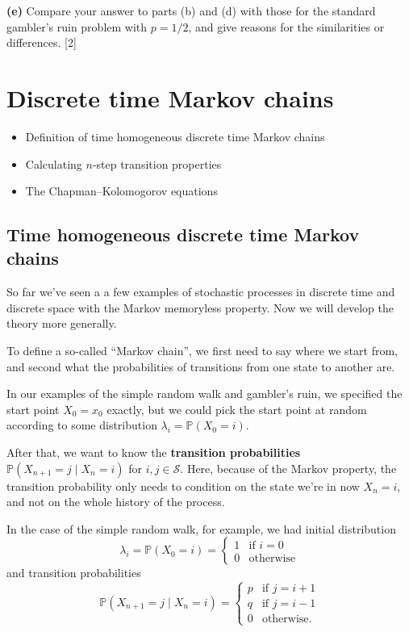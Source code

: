 \documentclass[
  a4paper,
]{article}
\providecommand{\tightlist}{%
  \setlength{\itemsep}{0pt}\setlength{\parskip}{0pt}}
\theoremstyle{definition}
\theoremstyle{definition}
\theoremstyle{definition}
\theoremstyle{remark}
\begin{document}
\textbf{(e)} Compare your answer to parts (b) and (d) with those for the standard gambler's ruin problem with \(p = 1/2\), and give reasons for the similarities or differences. {{[}2{]}}

\hypertarget{S05-markov-chains}{%
\section{Discrete time Markov chains}\label{S05-markov-chains}}

\begin{itemize}
\tightlist
\item
  Definition of time homogeneous discrete time Markov chains
\item
  Calculating \(n\)-step transition properties
\item
  The Chapman--Kolomogorov equations
\end{itemize}

\hypertarget{thmc}{%
\subsection{Time homogeneous discrete time Markov chains}\label{thmc}}

So far we've seen a a few examples of stochastic processes in discrete time and discrete space with the Markov memoryless property. Now we will develop the theory more generally.

To define a so-called ``Markov chain'', we first need to say where we start from, and second what the probabilities of transitions from one state to another are.

In our examples of the simple random walk and gambler's ruin, we specified the start point \(X_0 = x_0\) exactly, but we could pick the start point at random according to some distribution \(\lambda_i = \mathbb P(X_0 = i)\).

After that, we want to know the \textbf{transition probabilities} \(\mathbb P(X_{n+1} = j \mid X_n = i)\) for \(i,j \in \mathcal S\). Here, because of the Markov property, the transition probability only needs to condition on the state we're in now \(X_n = i\), and not on the whole history of the process.

In the case of the simple random walk, for example, we had initial distribution
\[ \lambda_i = \mathbb P(X_0 = i) = \begin{cases} 1 & \text{if $i = 0$} \\ 0 & \text{otherwise} \end{cases} \]
and transition probabilities
\[ \mathbb P(X_{n+1} = j \mid X_n = i) = \begin{cases} p & \text{if $j = i+1$} \\ q & \text{if $j = i-1$} \\ 0 & \text{otherwise.} \end{cases} \]
\end{document}
